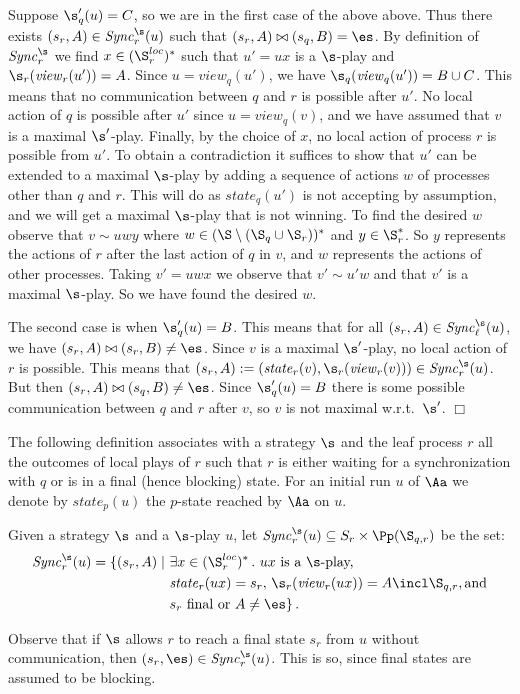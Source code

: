 \documentclass{llncs}
\newcommand{\Sync}{\mathit{Sync}}
\newcommand{\state}{\mathit{state}}
\newcommand{\view}{\mathit{view}}
\renewenvironment{proof}{{\em Proof. }}{\nopagebreak
  \hspace*{\fill}$\Box$}
\begin{document}
\begin{proof}
Suppose $\s'_q(u)=C$, so we are in the first case of the above
above. Thus there exists $(s_r,A)\in\Sync^\s_r(u)$ such that $(s_r,A)
\bowtie (s_q,B) =\es$. By definition of $\Sync^\s_r$ we find
$x\in(\S^{loc}_r)^*$ such that $u'=ux$ is a $\s$-play and
$\s_r(\view_r(u'))=A$. Since $u=\view_q(u')$, we have
$\s_q(\view_q(u'))=B\cup C$. This means that no communication between
$q$ and $r$ is possible after $u'$. No local action of $q$ is possible
after $u'$ since $u=\view_q(v)$, and we have assumed that $v$ is a
maximal $\s'$-play. Finally, by the choice of $x$, no local action of
process $r$ is possible from $u'$. To obtain a contradiction it
suffices to show that $u'$ can be extended to a maximal $\s$-play by
adding a sequence of actions $w$ of processes other than $q$ and
$r$. This will do as $\state_q(u')$ is not accepting by assumption,
and we will get a maximal $\s$-play that is not winning.  To find the
desired $w$ observe that $v \sim uwy$ where
$w\in(\S\setminus (\S_q\cup\S_r))^*$ and $y\in\S^*_r$. So $y$
represents the actions of $r$ after the last action of  $q$ in $v$,
and $w$ represents the actions of other processes.  Taking $v'=uwx$ we
observe that $v' \sim u'w$ and 
that $v'$ is a maximal $\s$-play. So we have found the desired $w$.



The second case is when $\s'_q(u)=B$. This means that for all 
$(s_r,A)\in\Sync^\s_\ell(u)$, we have 
$(s_r,A) \bowtie (s_r,B) \neq \es$. Since $v$ is a maximal $\s'$-play,
 no local action of $r$ is possible. This means that
 $(s_r,A):=(\state_r(v),\s_r(\view_r(v)))\in\Sync^\s_r(u)$. But then
 $(s_r,A) \bowtie (s_q,B)\not=\es$. Since $\s'_q(u)=B$ there is
 some  possible communication between
 $q$ and $r$ after $v$, so $v$ is not maximal
 w.r.t.~$\s'$.
\end{proof}

The following definition associates with a strategy $\s$ and the leaf
process $r$ all the outcomes of local plays of $r$ such that $r$ is
either waiting for a synchronization with $q$ or is in a final (hence
blocking) state.  For an initial run $u$ of $\Aa$ we denote by
$\state_p(u)$ the $p$-state reached by $\Aa$ on $u$.


 \begin{definition}\label{d:outcome}
Given a strategy $\s$ and a
$\s$-play $u$, let $\Sync_r^\s(u)\subseteq S_r \times \Pp(\S_{q,r})$ be the set:
\begin{align*}
  \Sync_r^\s(u)=\{(s_r,A) \mid \ & \exists x\in(\S^{loc}_r)^*\, .\
    \text{$ux$ is a $\s$-play,}\\
      & \state_r(ux)=s_r,\, 
     \s_r(\view_r(ux))=A\incl \S_{q,r}, \text{and}\\
     &s_r \text{ final or } A\not=\es\}\,.
\end{align*}   
 \end{definition}
Observe that if $\s$ allows $r$ to reach a final state $s_r$ from $u$
without communication, then $(s_r,\es)\in \Sync_r^\s(u)$. This is so,
since final states are assumed to be blocking.
\end{document}
